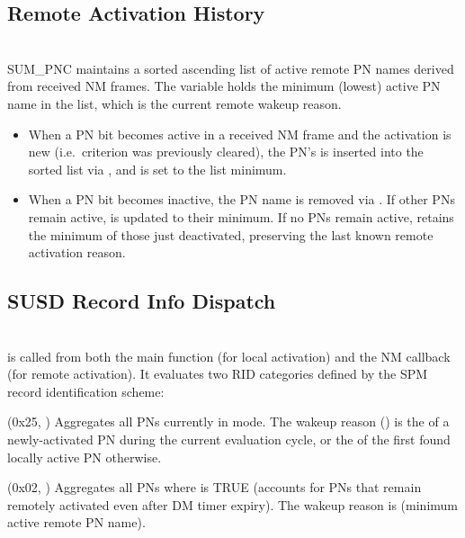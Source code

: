 \subsection{Remote Activation History}
\\
SUM\_PNC maintains a sorted ascending list  of active remote PN names derived from received NM frames. The variable  holds the minimum (lowest) active PN name in the list, which is the current remote wakeup reason.
\\
\begin{itemize}
  \item When a PN bit becomes active in a received NM frame and the activation is new (i.e.\ criterion was previously cleared), the PN's  is inserted into the sorted list via , and  is set to the list minimum.
  \item When a PN bit becomes inactive, the PN name is removed via . If other PNs remain active,  is updated to their minimum. If no PNs remain active,  retains the minimum of those just deactivated, preserving the last known remote activation reason.
\end{itemize}

{}

\subsection{SUSD Record Info Dispatch}
\\
 is called from both the main function (for local activation) and the NM callback (for remote activation). It evaluates two RID categories defined by the SPM record identification scheme:

\begin{description}
  \item {} (0x25, ) Aggregates all PNs currently in  mode. The wakeup reason () is the  of a newly-activated PN during the current evaluation cycle, or the  of the first found locally active PN otherwise.
  \item {} (0x02, ) Aggregates all PNs where  is TRUE (accounts for PNs that remain remotely activated even after DM timer expiry). The wakeup reason is  (minimum active remote PN name).
\end{description}

